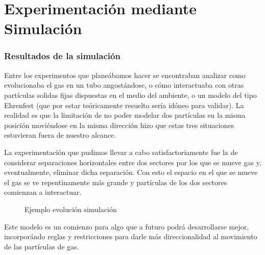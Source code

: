 \documentclass[10pt,a4paper]{article}
\begin{document}
 

\part*{Experimentaci\'on mediante Simulaci\'on}
\section*{Resultados de la simulaci\'on}

Entre los experimentos que plane\'abamos hacer se encontraban analizar como evolucionaba el gas en un tubo angost\'andose, o c\'omo interactuaba con otras part\'iculas solidas fijas dispuestas en el medio del ambiente, o un modelo del tipo Ehrenfest (que por estar te\'oricamente resuelto ser\'ia id\'oneo para validar). La realidad es que la limitaci\'on de no poder modelar dos part\'iculas en la misma posici\'on movi\'endose en la misma direcci\'on hizo que estas tres situaciones estuvieran fuera de nuestro alcance.

La experimentaci\'on que pudimos llevar a cabo satisfactoriamente fue la de considerar separaciones horizontales entre dos sectores por los que se mueve gas y, eventualmente, eliminar dicha separaci\'on. Con esto el espacio en el que se mueve el gas se ve repentinamente m\'as grande y part\'iculas de los dos sectores comienzan a interactuar.

\begin{figure}[htbp]
\centering
{}
\caption{Ejemplo evoluci\'on simulaci\'on}
\end{figure}



Este modelo es un comienzo para algo que a futuro podr\'a desarrollarse mejor, incorpor\'ando reglas y restricciones para darle m\'as direccionalidad al movimiento de las part\'iculas de gas.
\end{document}
